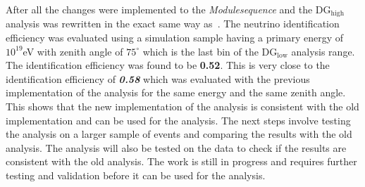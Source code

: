After all the changes were implemented to the \textit{Modulesequence} and the DG$\mathrm{_{high}}$ analysis was rewritten in the exact same way as~\cite{PierreAuger:2011cpc}. The neutrino identification efficiency was evaluated using a simulation sample having a primary energy of $10^{19}$eV with zenith angle of $75^\circ$ which is the last bin of the DG$\mathrm{_{low}}$ analysis range. The identification efficiency was found to be \textbf{0.52}. This is very close to the identification efficiency of \textbf{\textit{0.58}} which was evaluated with the previous implementation of the analysis for the same energy and the same zenith angle. This shows that the new implementation of the analysis is consistent with the old implementation and can be used for the analysis. The next steps involve testing the analysis on a larger sample of events and comparing the results with the old analysis. The analysis will also be tested on the data to check if the results are consistent with the old analysis. The work is still in progress and requires further testing and validation before it can be used for the analysis. 
